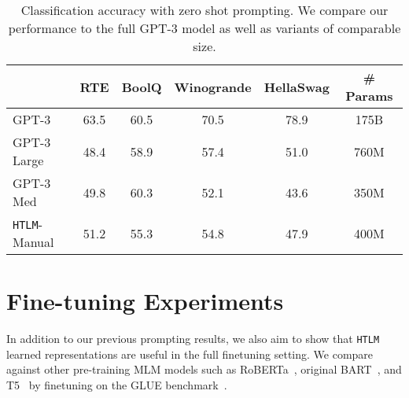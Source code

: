\documentclass[11pt,a4paper]{article}
\newcommand{\HTLM}{\texttt{HTLM}}
\begin{document}
\begin{table*}[htb]
\centering
\begin{tabular}{@{}lccccc@{}}
\toprule
 & \multicolumn{1}{l}{RTE} & \multicolumn{1}{l}{BoolQ} & \multicolumn{1}{l}{Winogrande} & HellaSwag & \# Params\\ \midrule
GPT-3        & 63.5 & 60.5 & 70.5 & 78.9 & 175B\\
GPT-3 Large  & 48.4 & 58.9 & 57.4 & 51.0 & 760M\\ 
GPT-3 Med  & 49.8 & 60.3 & 52.1 & 43.6 & 350M\\ \midrule
\HTLM{}-Manual & 51.2 & 55.3 & 54.8 & 47.9 & 400M\\ \bottomrule
\end{tabular}
\caption{Classification accuracy with zero shot prompting. We compare our performance to the full GPT-3 model as well as variants of comparable size.}
\label{table:zero_shot_classification}
\end{table*}



\section{Fine-tuning Experiments}
In addition to our previous prompting results, we also aim to show that \HTLM{} learned representations are useful in the full finetuning setting. We compare against other pre-training MLM models such as RoBERTa~\cite{ROBERTA}, original BART~\cite{BART}, and T5~\cite{T5} by finetuning on the GLUE benchmark~\citep{GLUE}. 
\end{document}
